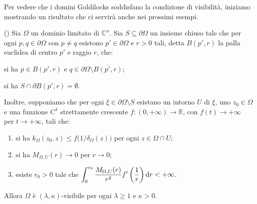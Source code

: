Per vedere che i domini Goldilocks soddisfano la condizione di visibilità, iniziamo mostrando un risultato che ci servirà anche nei prossimi esempi.

\begin{thm} \label{extvis}
    (\cite[Theorem 1.9]{CMS}) Sia $\Omega$ un dominio limitato di $\mathbb{C}^n$. Sia $S\subseteq\partial\Omega$ un insieme chiuso tale che per ogni $p,q\in\partial\Omega$ con $p\not=q$ esistono $p'\in\partial\Omega$ e $r>0$ tali, detta $B(p',r)$ la palla euclidea di centro $p'$ e raggio $r$, che:
    \begin{nlist}
        \item si ha $p\in B(p',r)$ e $q\in\partial\Omega\setminus\overline{B(p',r)}$;
        \item si ha $S\cap\partial B(p',r)=\emptyset$.
    \end{nlist}
    
    Inoltre, supponiamo che per ogni $\xi\in\partial\Omega\setminus S$ esistano un intorno $U$ di $\xi$, uno $z_0\in\Omega$ e una funzione $C^1$ strettamente crescente $f:(0,+\infty)\longrightarrow\mathbb{R}$, con $f(t)\longrightarrow+\infty$ per $t\longrightarrow+\infty$, tali che:
    \begin{enumerate}[label={(\arabic*)}]
        \item si ha $k_\Omega(z_0,z) \le f\big(1/\delta_\Omega(z)\big)$ per ogni $z\in\Omega\cap U$;
        \item si ha $M_{\Omega,U}(r)\longrightarrow 0$ per $r\longrightarrow 0$;
        \item esiste $r_0>0$ tale che $\displaystyle\int_0^{r_0}\frac{M_{\Omega,U}(r)}{r^2}f'\left(\frac{1}{r}\right)\mathop{}\!\mathrm{d} r<+\infty$.
    \end{enumerate}

    Allora $\Omega$ è $(\lambda,\kappa)$-visibile per ogni $\lambda \ge 1$ e $\kappa>0$.
\end{thm}

